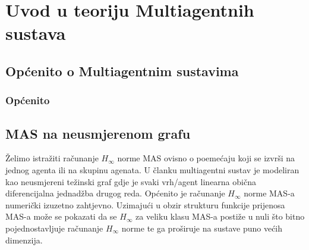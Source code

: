 \chapter[Uvod u teoriju Multiagentnih sustava][MAS]{Uvod u teoriju Multiagentnih sustava}
\section[Općenito o Multiagentnim sustavima][Općenito o Multiagentnim sustavima]{Općenito o Multiagentnim sustavima}
\subsection{Općenito}
\section[MAS na neusmjerenom grafu][MAS na neusmjerenom grafu]{MAS na neusmjerenom grafu}
Želimo istražiti računanje $H_\infty$ norme MAS ovisno o poemećaju koji se izvrši na jednog agenta ili na skupinu agenata.
U članku \cite{nakic2022short} multiagentni sustav je modeliran kao neusmjereni težinski graf gdje je svaki vrh/agent linearna obična diferencijalna jednadžba drugog reda. Općenito je računanje $H_\infty$ norme MAS-a numerički izuzetno zahtjevno. Uzimajući u obzir strukturu funkcije prijenosa MAS-a može se pokazati da se $H_\infty$ za veliku klasu MAS-a postiže u nuli što bitno pojednostavljuje računanje $H_\infty$ norme te ga proširuje na sustave puno većih dimenzija. 

